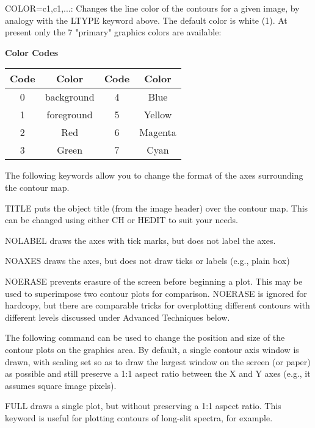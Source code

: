 COLOR=c1,c1,...: Changes the line color of the contours for a given image,
by analogy with the LTYPE keyword above.  The default color is white (1).
At present only the 7 "primary" graphics colors are available:

\begin{center}
{\bf Color Codes}\\
\begin{tabular}{cccc}
\hline
Code & Color & Code & Color\\
\hline
0 & background & 4 & Blue\\    
1 & foreground & 5 & Yellow\\  
2 & Red        & 6 & Magenta\\ 
3 & Green      & 7 & Cyan\\    
\hline
\end{tabular}
\end{center}

 
The following keywords allow you to change the format of the axes
surrounding the contour map.
 
TITLE puts the object title (from the image header) over the contour map.
This can be changed using either CH or HEDIT to suit your needs.
 
NOLABEL draws the axes with tick marks, but does not label the axes.
 
NOAXES draws the axes, but does not draw ticks or labels (e.g., plain box)
 
NOERASE prevents erasure of the screen before beginning a plot. This may be
used to superimpose two contour plots for comparison.  NOERASE is ignored
for hardcopy, but there are comparable tricks for overplotting different
contours with different levels discussed under Advanced Techniques below.
 
 
The following command can be used to change the position and size of the
contour plots on the graphics area.  By default, a single contour axis
window is drawn, with scaling set so as to draw the largest window on the
screen (or paper) as possible and still preserve a 1:1 aspect ratio between
the X and Y axes (e.g., it assumes square image pixels).
 
FULL draws a single plot, but without preserving a 1:1 aspect ratio.  This
keyword is useful for plotting contours of long-slit spectra, for example.
 
